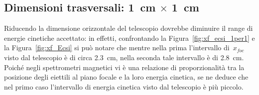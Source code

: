 \subsection*{Dimensioni trasversali: 1~cm $\times$ 1~cm}



Riducendo la dimensione orizzontale del telescopio dovrebbe diminuire il range di energie cinetiche accettato: in effetti, confrontando la Figura~\ref{fig:xf_ecsi_1per1} e la Figura~\ref{fig:xf_Ecsi} si può notare che mentre nella prima l'intervallo di~$x_{foc}$ visto dal telescopio è di circa 2.3~cm, nella seconda tale intervallo è di 2.8~cm. Poiché negli spettrometri magnetici vi è una relazione di proporzionalità tra la posizione degli eiettili al piano focale e la loro energia cinetica, se ne deduce che nel primo caso l'intervallo di energia cinetica visto dal telescopio è più piccolo.
 


